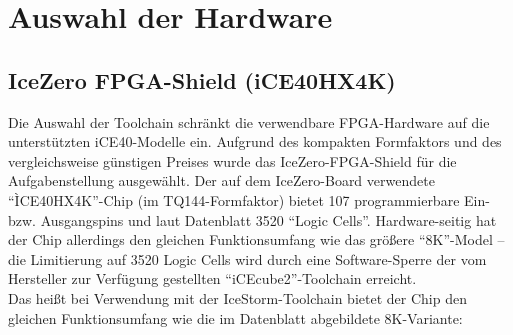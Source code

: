 \section{Auswahl der Hardware}

\subsection{IceZero FPGA-Shield (iCE40HX4K)}

Die Auswahl der Toolchain schränkt die verwendbare FPGA-Hardware auf die unterstützten iCE40-Modelle ein.
Aufgrund des kompakten Formfaktors und des vergleichsweise günstigen Preises wurde das IceZero-FPGA-Shield für die Aufgabenstellung ausgewählt.
Der auf dem IceZero-Board verwendete ``ÌCE40HX4K''-Chip (im TQ144-Formfaktor) bietet 107 programmierbare Ein- bzw. Ausgangspins und laut Datenblatt 3520 ``Logic Cells''. 
Hardware-seitig hat der Chip allerdings den gleichen Funktionsumfang wie das größere ``8K''-Model -- die Limitierung auf 3520 Logic Cells  wird durch eine Software-Sperre der vom Hersteller zur Verfügung gestellten ``iCEcube2''-Toolchain erreicht.\\
Das heißt bei Verwendung mit der IceStorm-Toolchain bietet der Chip den gleichen Funktionsumfang wie die im Datenblatt abgebildete 8K-Variante:

